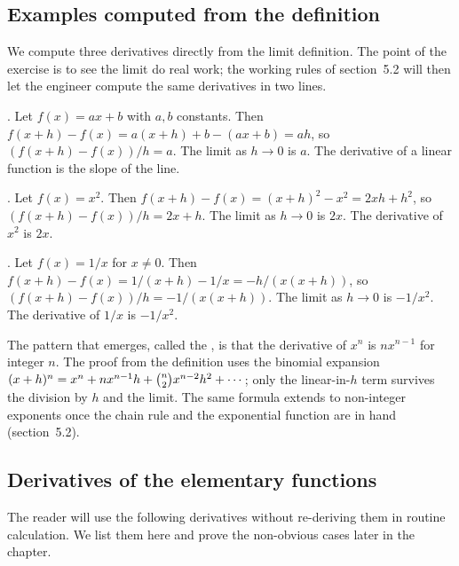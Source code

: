 \subsection{Examples computed from the definition}

We compute three derivatives directly from the limit definition.
The point of the exercise is to see the limit do real work; the
working rules of section~5.2 will then let the engineer compute
the same derivatives in two lines.

. Let $f(x) = a x + b$ with $a, b$
constants. Then $f(x + h) - f(x) = a(x + h) + b - (a x + b) = a h$,
so $(f(x + h) - f(x)) / h = a$. The limit as $h \to 0$ is $a$. The
derivative of a linear function is the slope of the line.

. Let $f(x) = x^{2}$. Then $f(x + h) -
f(x) = (x + h)^{2} - x^{2} = 2 x h + h^{2}$, so $(f(x + h) -
f(x)) / h = 2 x + h$. The limit as $h \to 0$ is $2 x$. The
derivative of $x^{2}$ is $2 x$.

. Let $f(x) = 1/x$ for $x \neq 0$. Then
$f(x + h) - f(x) = 1/(x + h) - 1/x = -h/(x(x + h))$, so
$(f(x + h) - f(x)) / h = -1/(x(x + h))$. The limit as $h \to 0$
is $-1/x^{2}$. The derivative of $1/x$ is $-1/x^{2}$.

The pattern that emerges, called the , is
that the derivative of $x^{n}$ is $n x^{n - 1}$ for integer $n$.
The proof from the definition uses the binomial expansion
$(x + h)^{n} = x^{n} + n x^{n-1} h + \tbinom{n}{2} x^{n-2} h^{2} +
\cdots$; only the linear-in-$h$ term survives the division by $h$
and the limit. The same formula extends to non-integer exponents
once the chain rule and the exponential function are in hand
(section~5.2).

\subsection{Derivatives of the elementary functions}

The reader will use the following derivatives without re-deriving
them in routine calculation. We list them here and prove the
non-obvious cases later in the chapter.

